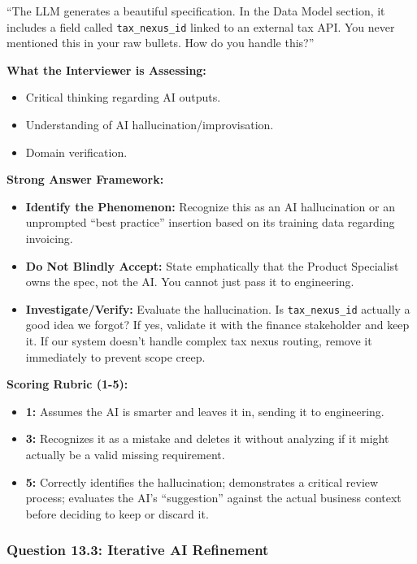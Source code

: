 ``The LLM generates a beautiful specification. In the Data Model
section, it includes a field called \texttt{tax\_nexus\_id} linked to an
external tax API. You never mentioned this in your raw bullets. How do
you handle this?''

\textbf{What the Interviewer is Assessing:}

\begin{itemize}
\tightlist
\item
  Critical thinking regarding AI outputs.
\item
  Understanding of AI hallucination/improvisation.
\item
  Domain verification.
\end{itemize}

\textbf{Strong Answer Framework:}

\begin{itemize}
\tightlist
\item
  \textbf{Identify the Phenomenon:} Recognize this as an AI
  hallucination or an unprompted ``best practice'' insertion based on
  its training data regarding invoicing.
\item
  \textbf{Do Not Blindly Accept:} State emphatically that the Product
  Specialist owns the spec, not the AI. You cannot just pass it to
  engineering.
\item
  \textbf{Investigate/Verify:} Evaluate the hallucination. Is
  \texttt{tax\_nexus\_id} actually a good idea we forgot? If yes,
  validate it with the finance stakeholder and keep it. If our system
  doesn't handle complex tax nexus routing, remove it immediately to
  prevent scope creep.
\end{itemize}

\textbf{Scoring Rubric (1-5):}

\begin{itemize}
\tightlist
\item
  \textbf{1:} Assumes the AI is smarter and leaves it in, sending it to
  engineering.
\item
  \textbf{3:} Recognizes it as a mistake and deletes it without
  analyzing if it might actually be a valid missing requirement.
\item
  \textbf{5:} Correctly identifies the hallucination; demonstrates a
  critical review process; evaluates the AI's ``suggestion'' against the
  actual business context before deciding to keep or discard it.
\end{itemize}

\subsubsection{Question 13.3: Iterative AI
Refinement}\label{question-13.3-iterative-ai-refinement}


